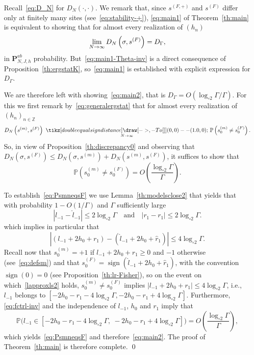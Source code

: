 \documentclass[AHL,Unicode,longabstracts,published]{cedram}
\newlength{\LETTERheight}
\newcommand*{\longto}[1]{\ %
{\tikz[double equal sign distance] \draw [->,-{To[]}] (0,0) -- (#1,0);}\ }
\newcommand{\bP}{\mathbf{P}}
\newcommand{\bbP}{\mathbb{P}}
\newcommand{\bbZ}{\mathbb{Z}}
\newcommand{\gG}{\Gamma}
\newcommand{\gs}{\sigma}
\newcommand{\ls}{\widehat{l}}
\newcommand{\rs}{\widehat{r}}
\newcommand{\loglog}{\log_{\circ 2}}
\DeclareMathOperator{\sign}{\mathrm{sign}}
\renewcommand*{\to}{\mathchoice{\longrightarrow}{\rightarrow}{\rightarrow}{\rightarrow}}
\begin{document}
Recall~\eqref{eq:D_N} for $D_N(\cdot, \cdot)$. We remark that, since $s^{(F, +)}$ and $s^{(F)}$ differ only at finitely many sites (see~\eqref{eq:stability-+}), \eqref{eq:main1} of Theorem~\ref{th:main} is equivalent to showing that for almost every realization of $(h_n)$
\begin{equation}\label{eq:main1-Theta-inv}
\lim_{N \to \infty} D_N \left(\gs,s^{(F)}\right)
= D_\gG,
\end{equation}
in $ \bP_{N, J, h}^{ab}$ probability. But~\eqref{eq:main1-Theta-inv} is a direct consequence of Proposition~\ref{th:ergstatK}, so~\eqref{eq:main1} is established with explicit expression for $D_\gG$.


We are therefore left with showing~\eqref{eq:main2}, that is $D_\gG=O(\loglog \gG/ \gG)$. For this we first remark by~\eqref{eq:generalergstat} that for almost every realization of $(h_n)_{n\in\bbZ}$
\begin{equation}
D_N\left(s^{(m)}, s^{(F)}\right)\underset{N\to \infty}{\longto{1.0}} \bbP\left(s_0^{(m)}\neq s_0^{(F)}\right).
\end{equation}
So, in view of Proposition~\ref{th:discrepancy0} and observing that $D_N(\sigma, s^{(F)})\leq D_N(\sigma, s^{(m)})+D_N(s^{(m)}, s^{(F)})$, it suffices to show that
\begin{equation}\label{eq:PsmneqsF}
\bbP\left(s_0^{(m)}\neq s_0^{(F)}\right)=O\left(\frac{\loglog \gG}{\gG}\right).
\end{equation}

To establish~\eqref{eq:PsmneqsF} we use Lemma~\ref{th:modelsclose2} that yields that with probability $1-O(1/\Gamma)$ and $\gG$ sufficiently large
\begin{equation}
|l_{-1}-\ls_{-1}|\le 2 \loglog \Gamma \quad \text{and} \quad \left|r_1-\rs_1\right|\le 2 \loglog\Gamma.
\end{equation}
which implies in particular that
\begin{equation}\label{lapproxls2}
\left|\left(l_{-1}+2h_0+r_1\right)-(\ls_{-1}+2h_0+\rs_1)\right|\le 4\loglog\gG.
\end{equation}
Recall now that $s_0^{(m)}=+1$ if $l_{-1}+2h_0+r_1\ge 0$ and $-1$ otherwise (see~\eqref{eq:defsm}) and that $s_0^{(F)}=\sign(\ls_{-1}+2h_0+\rs_1)$, with the convention $\sign(0)=0$ (see Proposition~\ref{th:lr-Fisher}), so on the event on which~\eqref{lapproxls2} holds, $ s^{(m)}_0 \neq s^{(F)}_0$ implies $|l_{-1}+2h_0+r_1|\le 4\loglog\gG$, i.e., $l_{-1}$ belongs to $ [-2h_0-r_1-4\loglog\gG, -2h_0-r_1+4\loglog\gG]$. Furthermore, \eqref{eq:fctrl-inv} and the independence of $l_{-1}$, $h_0$ and $r_1$ imply that
\begin{equation}
\bbP\bigl(l_{-1}\in \left[-2h_0-r_1-4\loglog\gG,\; -2h_0-r_1+4\loglog\gG\right]\bigr)=O \left(\frac {\loglog \gG}{\gG}\right),
\end{equation}
which yields~\eqref{eq:PsmneqsF} and therefore~\eqref{eq:main2}. The proof of Theorem~\ref{th:main} is therefore complete.
\qed
\end{document}
